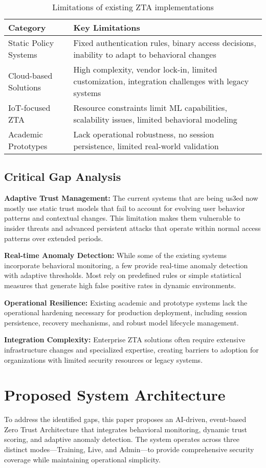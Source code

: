\documentclass[conference]{IEEEtran}
\begin{document}
\begin{table}[t]
\centering
\caption{Limitations of existing ZTA implementations}
\begin{tabular}{@{}lp{6cm}@{}}
\toprule
\textbf{Category} & \textbf{Key Limitations} \\
\midrule
Static Policy Systems & Fixed authentication rules, binary access decisions, inability to adapt to behavioral changes \\
Cloud-based Solutions & High complexity, vendor lock-in, limited customization, integration challenges with legacy systems \\
IoT-focused ZTA & Resource constraints limit ML capabilities, scalability issues, limited behavioral modeling \\
Academic Prototypes & Lack operational robustness, no session persistence, limited real-world validation \\
\bottomrule
\end{tabular}
\label{tab:existing_gaps}
\end{table}

\subsection{Critical Gap Analysis}
\textbf{Adaptive Trust Management:} The current systems that are being us3ed now mostly use static trust models that fail to account for evolving
user behavior patterns and contextual changes. This limitation
makes them vulnerable to insider threats and advanced persistent attacks that operate within normal access patterns over
extended periods.

\textbf{Real-time Anomaly Detection:} While some of the existing systems incorporate behavioral monitoring, a few provide real-time anomaly
detection with adaptive thresholds. Most rely on predefined
rules or simple statistical measures that generate high false
positive rates in dynamic environments.

\textbf{Operational Resilience:} Existing academic and prototype
systems lack the operational hardening necessary for production
deployment, including session persistence, recovery mechanisms, and robust model lifecycle management.

\textbf{Integration Complexity:} Enterprise ZTA solutions often
require extensive infrastructure changes and specialized expertise, creating barriers to adoption for organizations with limited
security resources or legacy systems.

\section{Proposed System Architecture}
To address the identified gaps, this paper proposes an AI-driven, event-based Zero Trust Architecture that integrates behavioral monitoring, dynamic trust scoring, and adaptive anomaly detection. The system operates across three distinct modes—Training, Live, and Admin—to provide comprehensive security coverage while maintaining operational simplicity.
\end{document}
